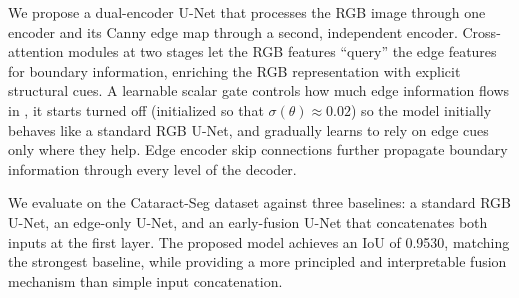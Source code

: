 We propose a dual-encoder U-Net that processes the RGB image through one encoder and its Canny edge map through a second, independent encoder. Cross-attention modules at two stages let the RGB features ``query'' the edge features for boundary information, enriching the RGB representation with explicit structural cues. A learnable scalar gate controls how much edge information flows in ,  it starts turned off (initialized so that $\sigma(\theta) \approx 0.02$) so the model initially behaves like a standard RGB U-Net, and gradually learns to rely on edge cues only where they help. Edge encoder skip connections further propagate boundary information through every level of the decoder.

We evaluate on the Cataract-Seg dataset \cite{cataractseg2023roboflow} against three baselines: a standard RGB U-Net, an edge-only U-Net, and an early-fusion U-Net that concatenates both inputs at the first layer. The proposed model achieves an IoU of 0.9530, matching the strongest baseline, while providing a more principled and interpretable fusion mechanism than simple input concatenation.
